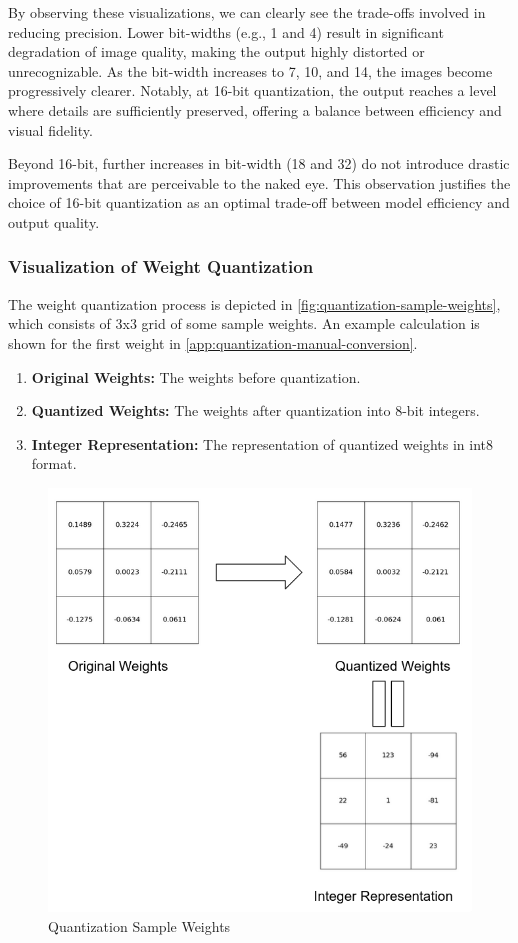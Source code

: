     By observing these visualizations, we can clearly see the trade-offs involved in reducing precision. Lower bit-widths (e.g., 1 and 4) result in significant degradation of image quality, making the output highly distorted or unrecognizable. As the bit-width increases to 7, 10, and 14, the images become progressively clearer. Notably, at 16-bit quantization, the output reaches a level where details are sufficiently preserved, offering a balance between efficiency and visual fidelity.

    Beyond 16-bit, further increases in bit-width (18 and 32) do not introduce drastic improvements that are perceivable to the naked eye. This observation justifies the choice of 16-bit quantization as an optimal trade-off between model efficiency and output quality.

    \subsubsection{Visualization of Weight Quantization}
    The weight quantization process is depicted in \autoref{fig:quantization-sample-weights}, which consists of 3x3 grid of some sample weights. An example calculation is shown for the first weight in \autoref{app:quantization-manual-conversion}.
    \begin{enumerate}[label=\textbf{\roman*.}]
        \item \textbf{Original Weights:} The weights before quantization.
        \item \textbf{Quantized Weights:} The weights after quantization into 8-bit integers.
        \item \textbf{Integer Representation:} The representation of quantized weights in int8 format.
    \end{enumerate}

    \begin{figure}[H]
        \centering
        \includegraphics[width=0.8\linewidth]{assets/quantization/quantization_sample_weights.png}
        \caption{Quantization Sample Weights}
        \label{fig:quantization-sample-weights}
    \end{figure}

